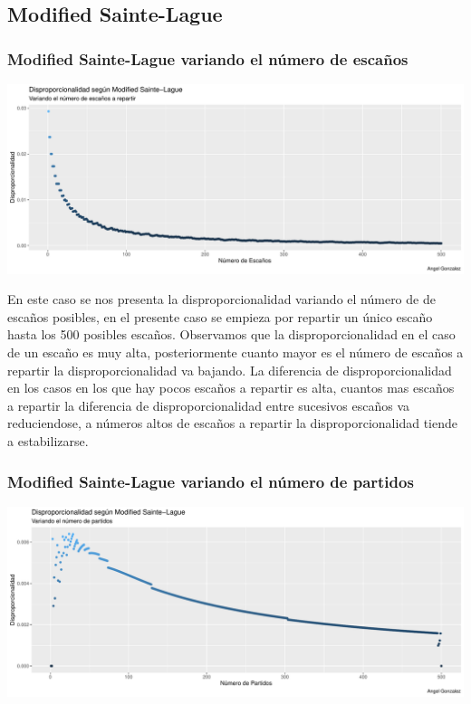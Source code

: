 \documentclass[12pt,a4paper,]{book}
\numberwithin{dummy}{section}
\theoremstyle{ocrenumbox}
\theoremstyle{blacknumex}
\theoremstyle{blacknumbox}
\theoremstyle{ocrenum}
\theoremstyle{ocrenum}
\begin{document}
\hypertarget{modified-sainte-lague}{%
\subsection{Modified Sainte-Lague}\label{modified-sainte-lague}}

\hypertarget{modified-sainte-lague-variando-el-nuxfamero-de-escauxf1os}{%
\subsubsection{Modified Sainte-Lague variando el número de
escaños}\label{modified-sainte-lague-variando-el-nuxfamero-de-escauxf1os}}

\begin{center}\includegraphics[width=0.95\linewidth]{figurasR/unnamed-chunk-19-1} \end{center}

En este caso se nos presenta la disproporcionalidad variando el número
de de escaños posibles, en el presente caso se empieza por repartir un
único escaño hasta los 500 posibles escaños. Observamos que la
disproporcionalidad en el caso de un escaño es muy alta, posteriormente
cuanto mayor es el número de escaños a repartir la disproporcionalidad
va bajando. La diferencia de disproporcionalidad en los casos en los que
hay pocos escaños a repartir es alta, cuantos mas escaños a repartir la
diferencia de disproporcionalidad entre sucesivos escaños va
reduciendose, a números altos de escaños a repartir la
disproporcionalidad tiende a estabilizarse.

\hypertarget{modified-sainte-lague-variando-el-nuxfamero-de-partidos}{%
\subsubsection{Modified Sainte-Lague variando el número de
partidos}\label{modified-sainte-lague-variando-el-nuxfamero-de-partidos}}

\begin{center}\includegraphics[width=0.95\linewidth]{figurasR/unnamed-chunk-20-1} \end{center}
\end{document}

